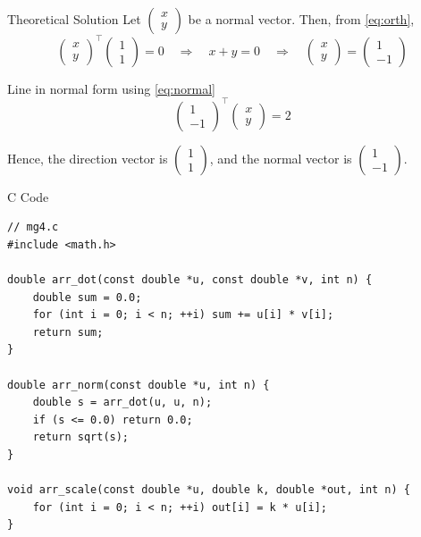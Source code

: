 \documentclass{beamer}
\begin{document}
\begin{frame}{Theoretical Solution}
Let $\begin{pmatrix} x \\ y \end{pmatrix}$ be a normal vector. Then, from \eqref{eq:orth},
\begin{equation}
\begin{pmatrix} x \\ y \end{pmatrix}^{\!\top}
\begin{pmatrix} 1 \\ 1 \end{pmatrix}
= 0
\quad\Longrightarrow\quad
x + y = 0
\quad\Longrightarrow\quad
\begin{pmatrix} x \\ y \end{pmatrix}
=
\begin{pmatrix} 1 \\ -1 \end{pmatrix}
\label{eq:normal-inst}
\end{equation}

Line in normal form using \eqref{eq:normal} 
\[
\begin{pmatrix} 1 \\ -1 \end{pmatrix}^{\!\top}
\begin{pmatrix} x \\ y \end{pmatrix}
= 2
\]


Hence, the direction vector is
$\displaystyle \begin{pmatrix} 1 \\ 1 \end{pmatrix}$,
and the normal vector is
$\displaystyle \begin{pmatrix} 1 \\ -1 \end{pmatrix}$.

\end{frame}

\begin{frame}[fragile]{C Code}
\begin{lstlisting}
// mg4.c
#include <math.h>

double arr_dot(const double *u, const double *v, int n) {
    double sum = 0.0;
    for (int i = 0; i < n; ++i) sum += u[i] * v[i];
    return sum;
}

double arr_norm(const double *u, int n) {
    double s = arr_dot(u, u, n);
    if (s <= 0.0) return 0.0;
    return sqrt(s);
}

void arr_scale(const double *u, double k, double *out, int n) {
    for (int i = 0; i < n; ++i) out[i] = k * u[i];
}
\end{lstlisting}
\end{frame}
\end{document}
